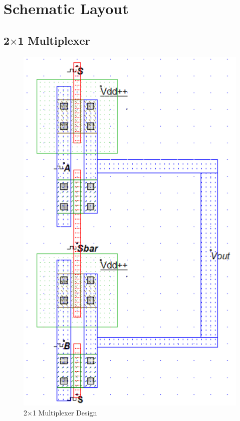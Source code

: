 \documentclass[a4paper,12pt]{article}
\begin{document}
	
	
	
	\newpage
	\section{Schematic Layout }
	\subsection{2$\times$1 Multiplexer}
\begin{figure}[H]
	\centering
	\includegraphics[width=0.7\linewidth]{Images/1}
	\caption{2$\times$1 Multiplexer Design }
	\label{fig:1}
\end{figure}
\end{document}
